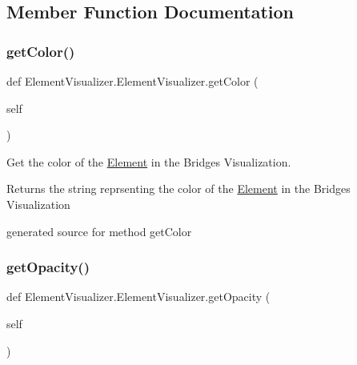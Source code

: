 \subsection{Member Function Documentation}
\hypertarget{class_element_visualizer_1_1_element_visualizer_a82a12847bbd1662462ef6493d240ee9d}{}\label{class_element_visualizer_1_1_element_visualizer_a82a12847bbd1662462ef6493d240ee9d} 
\subsubsection{\texorpdfstring{get\+Color()}{getColor()}}
{\footnotesize\ttfamily def Element\+Visualizer.\+Element\+Visualizer.\+get\+Color (\begin{DoxyParamCaption}\item[{}]{self }\end{DoxyParamCaption})}



Get the color of the \hyperlink{namespace_element}{Element} in the Bridges Visualization. 

\begin{DoxyReturn}{Returns}
the string reprsenting the color of the \hyperlink{namespace_element}{Element} in the Bridges Visualization\begin{DoxyVerb}generated source for method getColor \end{DoxyVerb}
 
\end{DoxyReturn}
\hypertarget{class_element_visualizer_1_1_element_visualizer_a5ca091e52fb9ef498b08a63b783aa51d}{}\label{class_element_visualizer_1_1_element_visualizer_a5ca091e52fb9ef498b08a63b783aa51d} 
\subsubsection{\texorpdfstring{get\+Opacity()}{getOpacity()}}
{\footnotesize\ttfamily def Element\+Visualizer.\+Element\+Visualizer.\+get\+Opacity (\begin{DoxyParamCaption}\item[{}]{self }\end{DoxyParamCaption})}



